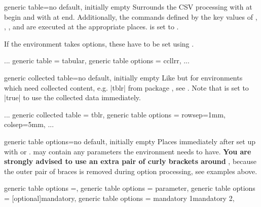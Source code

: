 \documentclass[a4paper,11pt]{ltxdoc}
\begin{document}
\begin{docCsvKey}[][doc new=2021-09-09]{generic table}{=}{no default, initially empty}
  Surrounds the CSV processing with 
  at begin and with  at end.
  Additionally, the commands defined by the key values of
  , , ,
  and  are executed at the appropriate places.
   is set to \cs{}\cs{}.\par
  If the environment  takes options, these have to be set using
  .

\begin{dispListing}
  ...
  generic table         = tabular,
  generic table options = {{ccllrr}},
  ...
\end{dispListing}
\end{docCsvKey}


\begin{docCsvKey}[][doc new and updated={2021-09-09}{2023-12-18}]{generic collected table}{=}{no default, initially empty}
  Like  but for environments which need
  collected content, e.g. |tblr| from package , see .
  Note that  is set to |true| to
  use the collected data immediately.

\begin{dispListing}
  ...
  generic collected table = tblr,
  generic table options   = {{rowsep=1mm, colsep=5mm}},
  ...
\end{dispListing}
\end{docCsvKey}


\begin{docCsvKey}[][doc new=2021-09-09]{generic table options}{=}{no default, initially empty}
  Places  immediately after  set up with
   or .
   may contain any parameters the environment  needs to have.
  \textbf{\color{red!50!black}You are strongly advised to use an extra pair of
  curly brackets  around }, because the outer pair of braces is
  removed during option processing, see examples above.
\begin{dispListing}
  generic table options =,
  generic table options = {{parameter}},
  generic table options = {[optional]{mandatory}},
  generic table options = {{mandatory 1}{mandatory 2}},
\end{dispListing}

\end{docCsvKey}
\end{document}
